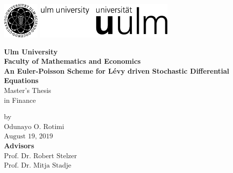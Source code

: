 \documentclass[oneside, 12pt]{scrreprt}
\begin{document}



\begin{titlepage}
\includegraphics[height=1.8cm]{images/unilogo_bild}
\hfill
\includegraphics[height=1.8cm]{images/unilogo_wort}\\[1em]

\thispagestyle{empty}
\textwidth28cm
\begin{center}
{\Large\bfseries Ulm University\\
   Faculty of Mathematics and Economics\\
}
\vspace{3cm}
{\LARGE\bfseries
An Euler-Poisson Scheme for L\'evy driven Stochastic Differential Equations
\\
}
\vspace{1cm}
{\Large
Master's Thesis} \\
\bigskip %
{\Large in Finance}
\end{center}
\vspace{1.5cm}
\begin{center}
by \\
$\mbox{Odunayo O. Rotimi}$ \\
$\mbox{August 19, 2019}$\\

\vspace*{1.2cm}
\textbf{ Advisors} \\

$\mbox{Prof. Dr. Robert Stelzer}$\\
$\mbox{Prof. Dr. Mitja Stadje}$
\end{center}
\vfill
\end{titlepage}
${ }$
\let\cleardoublepage\clearpage
\end{document}
